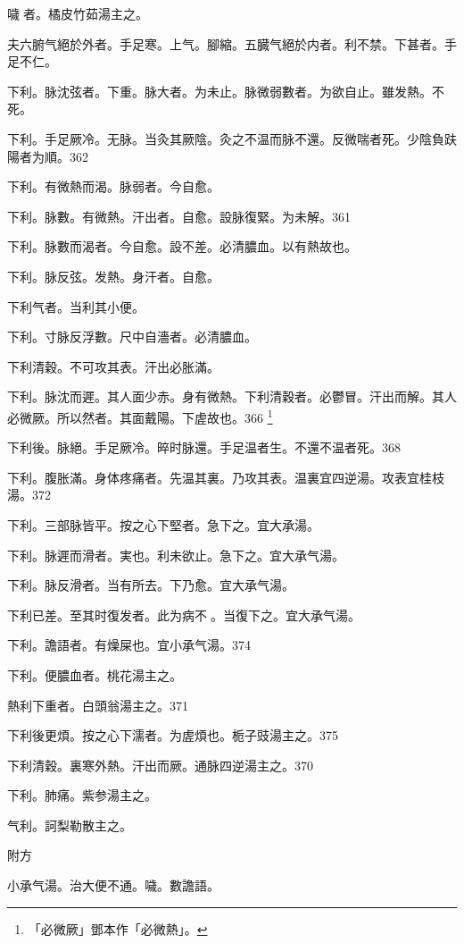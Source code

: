 噦{\sungtpii 𠱘}者。橘皮竹茹湯主之。

夫六腑气絕於外者。手足寒。上气。腳縮。五臓气絕於内者。利不禁。下甚者。手足不仁。

下利。脉沈弦者。下重。脉大者。为未止。脉微弱數者。为欲自止。雖发熱。不死。

下利。手足厥{\khaaitp 冷}。无脉。{\khaaitp 当灸其厥陰。}灸之不温{\khaaitp 而脉不還}。反微喘者死。少陰負趺陽者为順。362

下利。有微熱而渴。脉弱者。今自愈。

下利。脉數。有微熱。汗出者。自愈。設{\khaaitp 脉}復緊。为未解。361

下利。脉數而渴者。今自愈。設不差。必清膿血。以有熱故也。

下利。脉反弦。发熱。身汗者。自愈。

下利气者。当利其小便。

下利。寸脉反浮數。尺中自濇者。必清膿血。

下利清穀。不可攻其表。汗出必胀滿。

下利。脉沈而遲。其人面少赤。身有微熱。下利清穀者。必鬱冒。汗出而解。其人必微厥。所以然者。其面戴陽。下虗故也。366
	\footnote{
		「必微厥」鄧本作「必微熱」。
	}

下利後。脉絕。手足厥{\khaaitp 冷}。晬时脉還。手足温者生。不還{\khaaitp 不温}者死。368

下利。腹胀滿。身体疼痛者。先温其裏。乃攻其表。温裏宜四逆湯。攻表宜桂枝湯。372

下利。三部脉皆平。按之心下堅者。急下之。宜大承湯。

下利。脉遲而滑者。実也。利未欲止。急下之。宜大承气湯。

下利。脉反滑{\khaaitp 者}。当有所去。下乃愈。宜大承气湯。

下利已差。至其时復发者。此为病不{\sungtpii 𥁞}。当{\khaaitp 復}下之。宜{\khaaitp 大}承气湯。

下利。譫語者。有燥屎也。宜{\khaaitp 小}承气湯。374

下利。便膿血者。桃花湯主之。

熱利下重者。白頭翁湯主之。371

下利後更煩。按之心下濡者。为虗煩也。栀子{\khaaitp 豉}湯主之。375

下利清穀。裏寒外熱。汗出而厥。通脉四逆湯主之。370

下利。肺痛。紫参湯主之。

气利。訶梨勒散主之。

附方

小承气湯。治大便不通。噦。數譫語。

